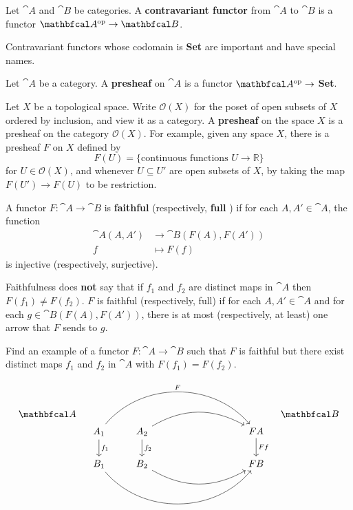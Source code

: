 \documentclass[11pt,a4paper]{article}
\begin{document}
\begin{definition}
    Let $\cat{A}$ and $\cat{B}$ be categories. A \textbf{contravariant functor}  from $\cat{A}$ to $\cat{B}$ is a functor $\catop{A}\to \cat{B}$.
\end{definition}
Contravariant functors whose codomain is \textbf{Set} are important and have special names.
\begin{definition}
    Let $\cat{A}$ be a category. A \textbf{presheaf} on $\cat{A}$ is a functor $\catop{A}\to$ \textbf{Set}.
\end{definition}
Let $X$ be a topological space. Write $\mathcal{O}(X)$ for the poset of open subsets of $X$ ordered by inclusion, and view it as a category. A \textbf{presheaf} on the space $X$ is a presheaf on the category $\mathcal{O}(X)$. For example, given any space $X$, there is a presheaf $F$ on $X$ defined by
$$F(U)=\{\text{continuous functions } U\to \mathbb{R}\}$$
for $U\in \mathcal{O}(X)$, and whenever $U\subseteq U'$ are open subsets of $X$, by taking the map $F(U')\to F(U)$ to be restriction.

\begin{definition}
    A functor $F: \cat{A}\to \cat{B}$ is \textbf{faithful} (respectively, \textbf{full} ) if for each $A,A'\in \cat{A}$, the function
    $$\begin{aligned}
        \cat{A}( A,A' ) &\to \cat{B}(F(A),F(A'))\\
        f &\mapsto F(f)
    \end{aligned}$$
    is injective (respectively, surjective).
\end{definition}

\begin{remark}
    Faithfulness does \textbf{not} say that if $f_1$ and $f_2$ are distinct maps in $\cat{A}$ then $F(f_1) \neq F(f_2)$. $F$ is faithful (respectively, full) if for each $A,A'\in \cat{A}$ and for each $g\in \cat{B}(F(A),F(A'))$, there is at most (respectively, at least) one arrow that $F$ sends to $g$.
\end{remark}

\begin{exercise}
    Find an example of a functor $F:\cat{A}\to \cat{B}$ such that $F$ is faithful but there exist distinct maps $f_1$ and $f_2$ in $\cat{A}$ with $F(f_1)=F(f_2)$.
\end{exercise}
\begin{solution}
\begin{equation*}
\begin{tikzcd}
    \cat{A}  &[-15pt]&&&&&&[-15pt] \cat{B} \\[-15pt]
    &[-15pt] A_1 \arrow[d, "f_1"] \arrow[rrrrr, bend left=50, "F"] & A_2 \arrow[d,"f_2"] \arrow[rrrr, bend left=30] &&&& FA \arrow[d, "Ff"] \\
    & B_1 \arrow[rrrrr, bend right=50] & B_2 \arrow[rrrr, bend right=30] &&&& FB
\end{tikzcd}
\end{equation*}
\end{solution}
\end{document}
